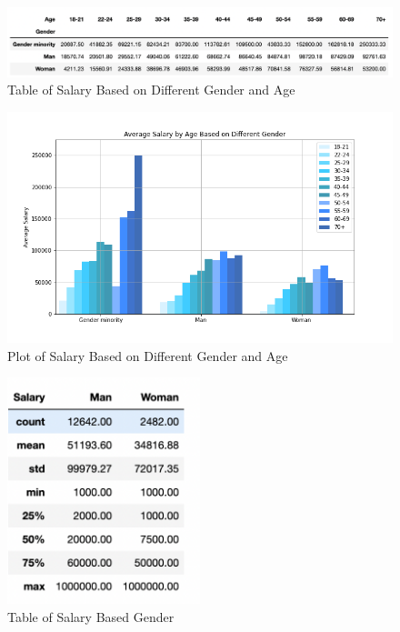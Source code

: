 \documentclass[10pt,onecolumn,letterpaper]{article}
\begin{document}
\begin{figure}[htbp]
  \centering
  \includegraphics[width=1\textwidth]{f9.png}
  \caption{Table of Salary Based on Different Gender and Age}
\end{figure}

\begin{figure}[htbp]
  \centering
  \includegraphics[width=1\textwidth]{f10.png}
  \caption{Plot of Salary Based on Different Gender and Age}
\end{figure}

\begin{figure}[htbp]
  \centering
  \includegraphics[width=0.5\textwidth]{f11.png}
  \caption{Table of Salary Based Gender}
\end{figure}
\end{document}
